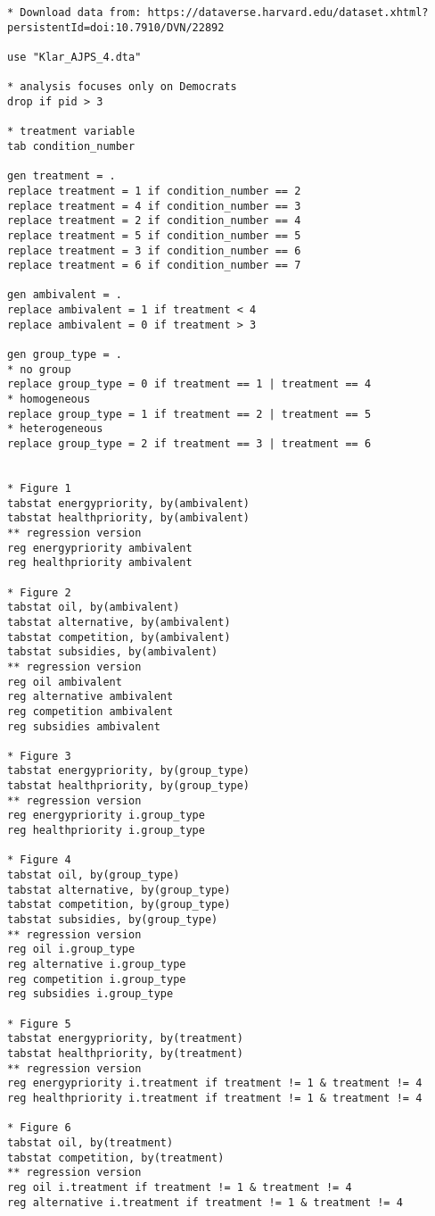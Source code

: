 \documentclass[a4paper]{exam}
\begin{document}
\begin{verbatim}
* Download data from: https://dataverse.harvard.edu/dataset.xhtml?persistentId=doi:10.7910/DVN/22892

use "Klar_AJPS_4.dta"

* analysis focuses only on Democrats
drop if pid > 3

* treatment variable
tab condition_number

gen treatment = .
replace treatment = 1 if condition_number == 2
replace treatment = 4 if condition_number == 3
replace treatment = 2 if condition_number == 4
replace treatment = 5 if condition_number == 5
replace treatment = 3 if condition_number == 6
replace treatment = 6 if condition_number == 7

gen ambivalent = .
replace ambivalent = 1 if treatment < 4
replace ambivalent = 0 if treatment > 3

gen group_type = .
* no group
replace group_type = 0 if treatment == 1 | treatment == 4
* homogeneous
replace group_type = 1 if treatment == 2 | treatment == 5 
* heterogeneous
replace group_type = 2 if treatment == 3 | treatment == 6 


* Figure 1
tabstat energypriority, by(ambivalent)
tabstat healthpriority, by(ambivalent)
** regression version
reg energypriority ambivalent
reg healthpriority ambivalent

* Figure 2
tabstat oil, by(ambivalent)
tabstat alternative, by(ambivalent)
tabstat competition, by(ambivalent)
tabstat subsidies, by(ambivalent)
** regression version
reg oil ambivalent
reg alternative ambivalent
reg competition ambivalent
reg subsidies ambivalent

* Figure 3
tabstat energypriority, by(group_type)
tabstat healthpriority, by(group_type)
** regression version
reg energypriority i.group_type
reg healthpriority i.group_type

* Figure 4
tabstat oil, by(group_type)
tabstat alternative, by(group_type)
tabstat competition, by(group_type)
tabstat subsidies, by(group_type)
** regression version
reg oil i.group_type
reg alternative i.group_type
reg competition i.group_type
reg subsidies i.group_type

* Figure 5
tabstat energypriority, by(treatment)
tabstat healthpriority, by(treatment)
** regression version
reg energypriority i.treatment if treatment != 1 & treatment != 4
reg healthpriority i.treatment if treatment != 1 & treatment != 4

* Figure 6
tabstat oil, by(treatment)
tabstat competition, by(treatment)
** regression version
reg oil i.treatment if treatment != 1 & treatment != 4
reg alternative i.treatment if treatment != 1 & treatment != 4


\end{verbatim}
\end{document}

